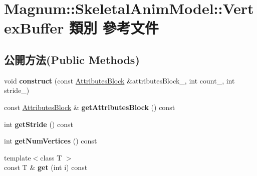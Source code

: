 \hypertarget{class_magnum_1_1_skeletal_anim_model_1_1_vertex_buffer}{}\section{Magnum\+:\+:Skeletal\+Anim\+Model\+:\+:Vertex\+Buffer 類別 參考文件}
\label{class_magnum_1_1_skeletal_anim_model_1_1_vertex_buffer}
\subsection*{公開方法(Public Methods)}
\begin{DoxyCompactItemize}
\item 
void {\bfseries construct} (const \hyperlink{class_magnum_1_1_attributes_block}{Attributes\+Block} \&attributes\+Block\+\_\+, int count\+\_\+, int stride\+\_\+)\hypertarget{class_magnum_1_1_skeletal_anim_model_1_1_vertex_buffer_a6b434d453a5926b5728265db89c154d7}{}\label{class_magnum_1_1_skeletal_anim_model_1_1_vertex_buffer_a6b434d453a5926b5728265db89c154d7}

\item 
const \hyperlink{class_magnum_1_1_attributes_block}{Attributes\+Block} \& {\bfseries get\+Attributes\+Block} () const \hypertarget{class_magnum_1_1_skeletal_anim_model_1_1_vertex_buffer_a3571a290f0f43358bfa550499432a530}{}\label{class_magnum_1_1_skeletal_anim_model_1_1_vertex_buffer_a3571a290f0f43358bfa550499432a530}

\item 
int {\bfseries get\+Stride} () const \hypertarget{class_magnum_1_1_skeletal_anim_model_1_1_vertex_buffer_a51397b48e372efcc93c90adcdd5f4ba7}{}\label{class_magnum_1_1_skeletal_anim_model_1_1_vertex_buffer_a51397b48e372efcc93c90adcdd5f4ba7}

\item 
int {\bfseries get\+Num\+Vertices} () const \hypertarget{class_magnum_1_1_skeletal_anim_model_1_1_vertex_buffer_a44bf2078b9656fc6f583a926727e8bf4}{}\label{class_magnum_1_1_skeletal_anim_model_1_1_vertex_buffer_a44bf2078b9656fc6f583a926727e8bf4}

\item 
{\footnotesize template$<$class T $>$ }\\const T \& {\bfseries get} (int i) const \hypertarget{class_magnum_1_1_skeletal_anim_model_1_1_vertex_buffer_a911da2a08cd2872b253c549b19973e1e}{}\label{class_magnum_1_1_skeletal_anim_model_1_1_vertex_buffer_a911da2a08cd2872b253c549b19973e1e}


\end{DoxyCompactItemize}
